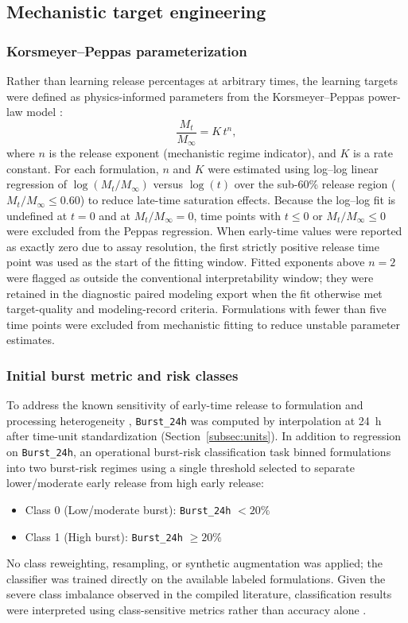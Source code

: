 \documentclass[preprint,12pt,authoryear]{elsarticle}
\begin{document}
\subsection{Mechanistic target engineering}
\label{subsec:targets}
\subsubsection{Korsmeyer--Peppas parameterization}
Rather than learning release percentages at arbitrary times, the learning targets were defined as physics-informed parameters from the Korsmeyer--Peppas power-law model \citep{Korsmeyer1983, RitgerPeppas1987}:
\begin{equation}
\frac{M_t}{M_\infty} = K\, t^n,
\end{equation}
where $n$ is the release exponent (mechanistic regime indicator), and $K$ is a rate constant. For each formulation, $n$ and $K$ were estimated using log--log linear regression of $\log(M_t/M_\infty)$ versus $\log(t)$ over the sub-60\% release region ($M_t/M_\infty \le 0.60$) to reduce late-time saturation effects. Because the log--log fit is undefined at $t=0$ and at $M_t/M_\infty = 0$, time points with $t \le 0$ or $M_t/M_\infty \le 0$ were excluded from the Peppas regression. When early-time values were reported as exactly zero due to assay resolution, the first strictly positive release time point was used as the start of the fitting window. Fitted exponents above $n=2$ were flagged as outside the conventional interpretability window; they were retained in the diagnostic paired modeling export when the fit otherwise met target-quality and modeling-record criteria. Formulations with fewer than five time points were excluded from mechanistic fitting to reduce unstable parameter estimates.

\subsubsection{Initial burst metric and risk classes}
To address the known sensitivity of early-time release to formulation and processing heterogeneity \citep{Fredenberg2011, Yoo2020Burst, FreibergZhu2004}, \texttt{Burst\_24h} was computed by interpolation at 24~h after time-unit standardization (Section~\ref{subsec:units}). In addition to regression on \texttt{Burst\_24h}, an operational burst-risk classification task binned formulations into two burst-risk regimes using a single threshold selected to separate lower/moderate early release from high early release:
\begin{itemize}
  \item Class 0 (Low/moderate burst): \texttt{Burst\_24h} $< 20\%$
  \item Class 1 (High burst): \texttt{Burst\_24h} $\ge 20\%$
\end{itemize}
No class reweighting, resampling, or synthetic augmentation was applied; the classifier was trained directly on the available labeled formulations. Given the severe class imbalance observed in the compiled literature, classification results were interpreted using class-sensitive metrics rather than accuracy alone \citep{HeGarcia2009Imbalanced, SokolovaLapalme2009Metrics}.
\end{document}
